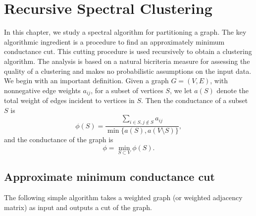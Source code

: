 \documentclass{book}
\numberwithin{exercise}{chapter}
\begin{document}
\chapter{Recursive Spectral Clustering}\label{chap:kvv}

In this chapter, we study a spectral algorithm for partitioning a graph. The key algorithmic ingredient is a procedure to  find an approximately minimum conductance cut. This cutting procedure is used recursively to obtain a clustering algorithm.
The analysis is based on a natural bicriteria measure for assessing the quality of a clustering and makes no probabilistic assumptions on the input data. We begin with an important definition. Given a graph $G=(V,E)$, with nonnegative edge weights $a_{ij}$, for a subset of vertices $S$, we let $a(S)$ denote the total weight of edges incident to vertices in $S$. Then the conductance of a subset $S$ is
\[
\phi(S) = \frac{\sum_{i \in S, j \not\in S} a_{ij}}{\min \{ a(S), a(V\setminus S)\}},
\]
and the conductance of the graph is
\[
\phi = \min_{S \subset V} \phi(S).
\]


\section{Approximate minimum conductance cut}

The following simple algorithm takes a weighted graph (or weighted adjacency matrix) as input and outputs a cut of the graph.

\begin{center}
\end{center}
\end{document}
